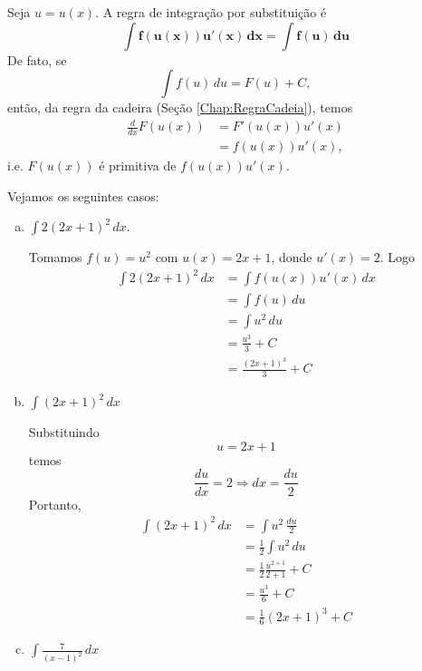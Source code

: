 \cleardoublepage\documentclass[../main.tex]{subfiles}
\begin{document}
Seja $u = u(x)$. A regra de integração por substituição é
\begin{equation}
  \boldsymbol{\int f(u(x))u'(x)\,dx = \int f(u)\,du}
\end{equation}
De fato, se
\begin{equation}
  \int f(u)\,du = F(u) + C,
\end{equation}
então, da regra da cadeira (Seção \ref{Chap:RegraCadeia}), temos
\begin{align*}
  \frac{d}{dx}F(u(x)) &= F'(u(x))u'(x) \\
                      &= f(u(x))u'(x),
\end{align*}
i.e. $F(u(x))$ é primitiva de $f(u(x))u'(x)$.

\begin{ex}
  Vejamos os seguintes casos:
  \begin{enumerate}[a)]
  \item $\displaystyle\int 2(2x+1)^2\,dx$.
    
    Tomamos $f(u) = u^2$ com $u(x) = 2x+1$, donde $u'(x) = 2$. Logo
    \begin{align*}
      \int 2(2x+1)^2\,dx &= \int f(u(x))u'(x)\,dx \\
                         &= \int f(u)\,du \\
                         &= \int u^2\,du \\
                         &= \frac{u^3}{3} + C \\
                         &= \frac{(2x+1)^3}{3} + C
    \end{align*}
     \item $ \int (2x+1)^2\,dx$
  
    Substituindo
  \begin{equation*}
    u = 2x+1
  \end{equation*}
  temos
  \begin{equation*}
    \frac{du}{dx} = 2 \Rightarrow dx = \frac{du}{2}
  \end{equation*}
  Portanto,
  \begin{align*}
    \int (2x+1)^2\,dx &= \int u^2\,\frac{du}{2}\\
                     &= \frac{1}{2}\int u^2\,du\\
                     &= \frac{1}{2}\frac{u^{2+1}}{2+1} + C\\
                     &= \frac{u^3}{6} + C\\
                     &= \frac{1}{6}(2x+1)^3 + C
  \end{align*}
  \item $ \int \frac{7}{(x-1)^2}\,dx$


\end{enumerate}
\end{ex}
\end{document}
